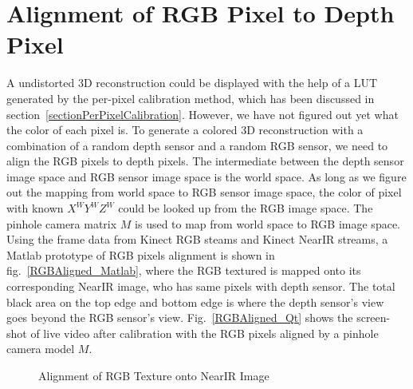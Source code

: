 \section{Alignment of RGB Pixel to Depth Pixel}
A undistorted 3D reconstruction could be displayed with the help of a LUT generated by the per-pixel calibration method, which has been discussed in section~\ref{sectionPerPixelCalibration}. However, we have not figured out yet what the color of each pixel is. To generate a colored 3D reconstruction with a combination of a random depth sensor and a random RGB sensor, we need to align the RGB pixels to depth pixels. The intermediate between the depth sensor image space and RGB sensor image space is the world space. As long as we figure out the mapping from world space to RGB sensor image space, the color of pixel with known \(X^WY^WZ^W\) could be looked up from the RGB image space. The pinhole camera matrix \(M\) is used to map from world space to RGB image space. Using the frame data from Kinect RGB steams and Kinect NearIR streams, a Matlab prototype of RGB pixels alignment is shown in fig.~\ref{RGBAligned_Matlab}, where the RGB textured is mapped onto its corresponding NearIR image, who has same pixels with depth sensor. The total black area on the top edge and bottom edge is where the depth sensor's view goes beyond the RGB sensor's view. Fig.~\ref{RGBAligned_Qt} shows the screen-shot of live video after calibration with the RGB pixels aligned by a pinhole camera model \(M\).

%
 \begin{figure}[b]
\hspace*{-0.5cm}
\centering
{}
\caption{Alignment of RGB Texture onto NearIR Image}
\label{Adaptive_Thresholding}
\end{figure}%
%

